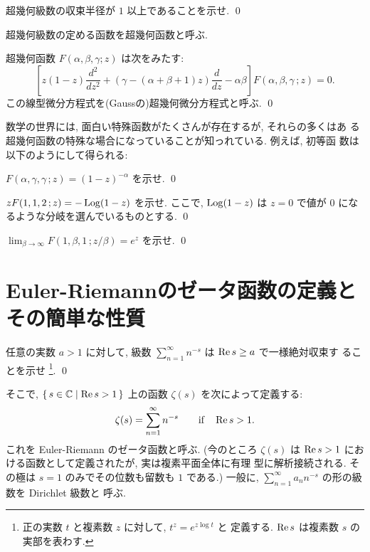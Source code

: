 \documentclass[12pt,twoside]{jarticle}
\begin{document}
\begin{question}
  超幾何級数の収束半径が $1$ 以上であることを示せ. \qed
\end{question}

\noindent 超幾何級数の定める函数を超幾何函数と呼ぶ.

\begin{question}
  超幾何函数 $F(\alpha,\beta,\gamma;z)$ は次をみたす:
  \[
    \left[
      z(1 - z) \frac{d^2}{dz^2}
      + (\gamma - (\alpha + \beta + 1) z) \frac{d}{dz}
      - \alpha\beta
    \right] F(\alpha,\beta,\gamma\,; z) = 0.
  \]%
  この線型微分方程式を(Gaussの)超幾何微分方程式と呼ぶ. \qed
\end{question}

数学の世界には, 面白い特殊函数がたくさんが存在するが, それらの多くはあ
る超幾何函数の特殊な場合になっていることが知っれている. 例えば, 初等函
数は以下のようにして得られる:

\begin{question}
  $F(\alpha,\gamma,\gamma\,; z) = (1 - z)^{-\alpha}$ を示せ. \qed
\end{question}

\begin{question}
  $z F(1,1,2\,; z) = - \mathop{\mathrm{Log}}\nolimits(1 - z)$ を示せ. ここで, $\mathop{\mathrm{Log}}\nolimits(1 - z)$ は 
  $z=0$ で値が $0$ になるような分岐を選んでいるものとする. \qed
\end{question}

\begin{question}
  $\lim_{\beta\to\infty}F(1,\beta,1\,;z/\beta) = e^z$ を示せ. \qed
\end{question}


\section{Euler-Riemannのゼータ函数の定義とその簡単な性質}

\begin{question}
  任意の実数 $a > 1$ に対して, 
  級数 $\sum_{n=1}^{\infty}n^{-s}$ は $\mathop{\mathrm{Re}}\nolimits s \ge a$ で一様絶対収束す
  ることを示せ%
  \footnote{正の実数 $t$ と複素数 $z$ に対して, $t^z = e^{z\log t}$ と
    定義する. $\mathop{\mathrm{Re}}\nolimits s$ は複素数 $s$ の実部を表わす.}. %
  \qed
\end{question}

\noindent そこで, $\{\,s\in{\mathbb C} \mid \mathop{\mathrm{Re}}\nolimits s > 1\,\}$ 上の函数 
$\zeta(s)$ を次によって定義する:
\[
  \zeta(s) = \sum_{n=1}^{\infty}n^{-s}
  \qquad \text{if} \quad \mathop{\mathrm{Re}}\nolimits s > 1.
\]%
これを Euler-Riemann のゼータ函数と呼ぶ. (今のところ $\zeta(s)$ は 
$\mathop{\mathrm{Re}}\nolimits s > 1$ における函数として定義されたが, 実は複素平面全体に有理
型に解析接続される. その極は $s=1$ のみでその位数も留数も $1$ である.) 
一般に, $\sum_{n=1}^{\infty} a_n n^{-s}$ の形の級数を Dirichlet 級数と
呼ぶ.
\end{document}
